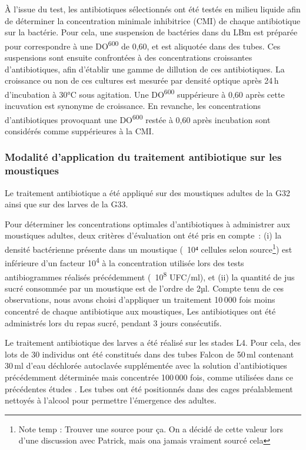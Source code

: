 À l'issue du test, les antibiotiques sélectionnés ont été testés en milieu liquide afin de déterminer la concentration minimale inhibitrice (CMI) de chaque antibiotique sur la bactérie.
Pour cela, une suspension de bactéries dans du LBm est préparée pour correspondre à une DO\textsuperscript{600} de 0,60, et est aliquotée dans des tubes.
Ces suspensions sont ensuite confrontées à des concentrations croissantes d'antibiotiques, afin d'établir une gamme de dillution de ces antibiotiques.
La croissance ou non de ces cultures est mesurée par densité optique après 24\,h d'incubation à 30°C sous agitation.
Une DO\textsuperscript{600} suppérieure à 0,60 après cette incuvation est synonyme de croissance. En revanche, les concentrations d'antibiotiques provoquant une DO\textsuperscript{600} restée à 0,60 après incubation sont considérés comme suppérieures à la CMI.

\subsubsection{Modalité d'application du traitement antibiotique sur les moustiques}

Le traitement antibiotique a été appliqué sur des moustiques adultes de la G32 ainsi que sur des larves de la G33.

Pour déterminer les concentrations optimales d'antibiotiques à administrer aux moustiques adultes, deux critères d'évaluation ont été pris en compte :
(i) la densité bactérienne présente dans un moustique (~10⁴ cellules selon source\footnote{Note temp : Trouver une source pour ça.
On a décidé de cette valeur lors d'une discussion avec Patrick, mais ona  jamais vraiment sourcé cela}) est inférieure d'un facteur 10\textsuperscript{4} à la concentration utilisée lors des tests antibiogrammes réalisés précédemment (~10\textsuperscript{8} UFC/ml), et (ii) la quantité de jus sucré consommée par un moustique est de l'ordre de 2µl.
Compte tenu de ces observations, nous avons choisi d'appliquer un traitement 10\,000 fois moins concentré de chaque antibiotique aux moustiques, Les antibiotiques ont été administrés lors du repas sucré, pendant 3 jours consécutifs. 

Le traitement antibiotique des larves a été réalisé sur les stades L4.
Pour cela, des lots de 30 individus ont été constitués dans des tubes Falcon de 50\,ml contenant 30\,ml d'eau déchlorée autoclavée supplémentée avec la solution d'antibiotiques précédemment déterminée mais concentrée 100\,000 fois, comme utilisées dans ce précédentes études \cite{dong2009}.
Les tubes ont été positionnés dans des cages préalablement nettoyés à l'alcool pour permettre l'émergence des adultes.

